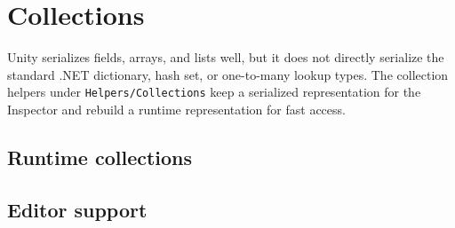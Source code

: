 \section{Collections}
\label{sec:collections}

Unity serializes fields, arrays, and lists well, but it does not directly serialize the standard .NET dictionary, hash set, or one-to-many lookup types. The collection helpers under \texttt{Helpers/Collections} keep a serialized representation for the Inspector and rebuild a runtime representation for fast access.

\subsection{Runtime collections}


\subsection{Editor support}

